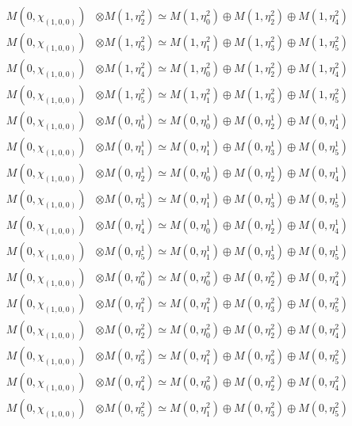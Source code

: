 \begin{align*}
M(0,\chi_{(1,0,0)}) &\otimes M(1,\eta^{2}_{2}) \simeq M(1,\eta^{2}_{0}) \oplus M(1,\eta^{2}_{2}) \oplus M(1,\eta^{2}_{4}) \\
M(0,\chi_{(1,0,0)}) &\otimes M(1,\eta^{2}_{3}) \simeq M(1,\eta^{2}_{1}) \oplus M(1,\eta^{2}_{3}) \oplus M(1,\eta^{2}_{5}) \\
M(0,\chi_{(1,0,0)}) &\otimes M(1,\eta^{2}_{4}) \simeq M(1,\eta^{2}_{0}) \oplus M(1,\eta^{2}_{2}) \oplus M(1,\eta^{2}_{4}) \\
M(0,\chi_{(1,0,0)}) &\otimes M(1,\eta^{2}_{5}) \simeq M(1,\eta^{2}_{1}) \oplus M(1,\eta^{2}_{3}) \oplus M(1,\eta^{2}_{5}) \\
M(0,\chi_{(1,0,0)}) &\otimes M(0,\eta^{1}_{0}) \simeq M(0,\eta^{1}_{0}) \oplus M(0,\eta^{1}_{2}) \oplus M(0,\eta^{1}_{4}) \\
M(0,\chi_{(1,0,0)}) &\otimes M(0,\eta^{1}_{1}) \simeq M(0,\eta^{1}_{1}) \oplus M(0,\eta^{1}_{3}) \oplus M(0,\eta^{1}_{5}) \\
M(0,\chi_{(1,0,0)}) &\otimes M(0,\eta^{1}_{2}) \simeq M(0,\eta^{1}_{0}) \oplus M(0,\eta^{1}_{2}) \oplus M(0,\eta^{1}_{4}) \\
M(0,\chi_{(1,0,0)}) &\otimes M(0,\eta^{1}_{3}) \simeq M(0,\eta^{1}_{1}) \oplus M(0,\eta^{1}_{3}) \oplus M(0,\eta^{1}_{5}) \\
M(0,\chi_{(1,0,0)}) &\otimes M(0,\eta^{1}_{4}) \simeq M(0,\eta^{1}_{0}) \oplus M(0,\eta^{1}_{2}) \oplus M(0,\eta^{1}_{4}) \\
M(0,\chi_{(1,0,0)}) &\otimes M(0,\eta^{1}_{5}) \simeq M(0,\eta^{1}_{1}) \oplus M(0,\eta^{1}_{3}) \oplus M(0,\eta^{1}_{5}) \\
M(0,\chi_{(1,0,0)}) &\otimes M(0,\eta^{2}_{0}) \simeq M(0,\eta^{2}_{0}) \oplus M(0,\eta^{2}_{2}) \oplus M(0,\eta^{2}_{4}) \\
M(0,\chi_{(1,0,0)}) &\otimes M(0,\eta^{2}_{1}) \simeq M(0,\eta^{2}_{1}) \oplus M(0,\eta^{2}_{3}) \oplus M(0,\eta^{2}_{5}) \\
M(0,\chi_{(1,0,0)}) &\otimes M(0,\eta^{2}_{2}) \simeq M(0,\eta^{2}_{0}) \oplus M(0,\eta^{2}_{2}) \oplus M(0,\eta^{2}_{4}) \\
M(0,\chi_{(1,0,0)}) &\otimes M(0,\eta^{2}_{3}) \simeq M(0,\eta^{2}_{1}) \oplus M(0,\eta^{2}_{3}) \oplus M(0,\eta^{2}_{5}) \\
M(0,\chi_{(1,0,0)}) &\otimes M(0,\eta^{2}_{4}) \simeq M(0,\eta^{2}_{0}) \oplus M(0,\eta^{2}_{2}) \oplus M(0,\eta^{2}_{4}) \\
M(0,\chi_{(1,0,0)}) &\otimes M(0,\eta^{2}_{5}) \simeq M(0,\eta^{2}_{1}) \oplus M(0,\eta^{2}_{3}) \oplus M(0,\eta^{2}_{5}) \\

\end{align*}
